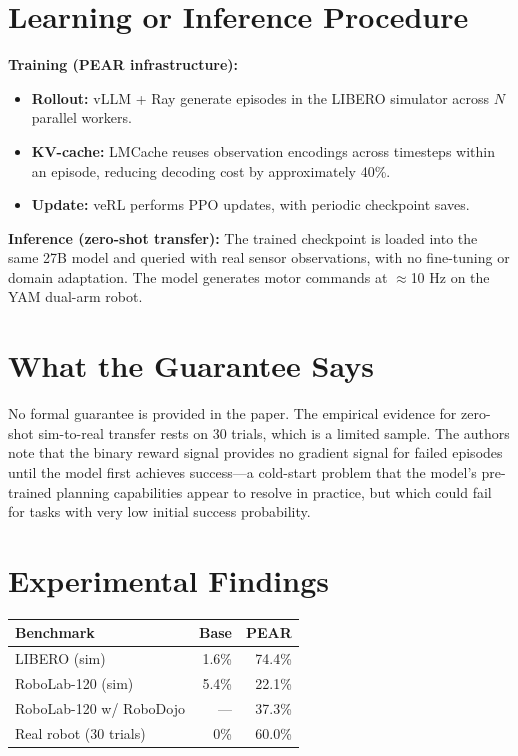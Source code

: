\documentclass[10pt,twocolumn]{article}
\begin{document}
\section{Learning or Inference Procedure}

\textbf{Training (PEAR infrastructure):}
\begin{itemize}[leftmargin=1em,itemsep=1pt]
  \item \textbf{Rollout:} vLLM + Ray generate episodes in the LIBERO simulator across $N$ parallel workers.
  \item \textbf{KV-cache:} LMCache reuses observation encodings across timesteps within an episode, reducing decoding cost by approximately 40\%.
  \item \textbf{Update:} veRL performs PPO updates, with periodic checkpoint saves.
\end{itemize}

\textbf{Inference (zero-shot transfer):}
The trained checkpoint is loaded into the same 27B model and queried with real sensor observations, with no fine-tuning or domain adaptation.
The model generates motor commands at $\approx$10 Hz on the YAM dual-arm robot.

\section{What the Guarantee Says}

No formal guarantee is provided in the paper.
The empirical evidence for zero-shot sim-to-real transfer rests on 30 trials, which is a limited sample.
The authors note that the binary reward signal provides no gradient signal for failed episodes until the model first achieves success---a cold-start problem that the model's pre-trained planning capabilities appear to resolve in practice, but which could fail for tasks with very low initial success probability.

\section{Experimental Findings}

\begin{center}
\small
\begin{tabular}{lrr}
\toprule
\textbf{Benchmark} & \textbf{Base} & \textbf{PEAR} \\
\midrule
LIBERO (sim)         & 1.6\%  & 74.4\% \\
RoboLab-120 (sim)    & 5.4\%  & 22.1\% \\
RoboLab-120 w/ RoboDojo & —    & 37.3\% \\
Real robot (30 trials) & 0\%  & 60.0\% \\
\bottomrule
\end{tabular}
\end{center}
\end{document}
